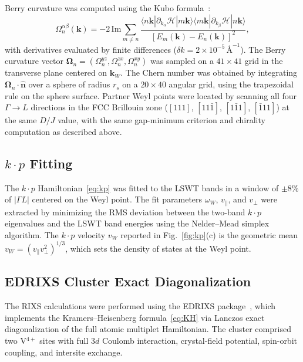\documentclass[aps,prb,twocolumn,superscriptaddress,longbibliography]{revtex4-2}
\begin{document}
Berry curvature was computed using the Kubo formula~\cite{Berry1984}:
\begin{equation}
  \Omega^{\alpha\beta}_n(\bm{k}) = -2\,\mathrm{Im}\sum_{m\neq n}
    \frac{\langle n\bm{k}|\partial_{k_\alpha}\mathcal{H}|m\bm{k}\rangle
          \langle m\bm{k}|\partial_{k_\beta}\mathcal{H}|n\bm{k}\rangle}
         {[E_m(\bm{k}) - E_n(\bm{k})]^2},
  \label{eq:kubo}
\end{equation}
with derivatives evaluated by finite differences ($\delta k = 2\times10^{-5}\,\text{\AA}^{-1}$).
The Berry curvature vector $\bm{\Omega}_n = (\Omega^{yz}_n, \Omega^{zx}_n, \Omega^{xy}_n)$
was sampled on a $41\times 41$ grid in the transverse plane centered on $\bm{k}_W$.
The Chern number was obtained by integrating $\bm{\Omega}_n\cdot\hat{\bm{n}}$ over
a sphere of radius $r_s$ on a $20\times 40$ angular grid, using the
trapezoidal rule on the sphere surface.
Partner Weyl points were located by scanning all four $\Gamma \to L$
directions in the FCC Brillouin zone ($[111]$, $[11\bar1]$, $[1\bar11]$,
$[\bar111]$) at the same $D/J$ value, with the same gap-minimum criterion
and chirality computation as described above.

\subsection{$k \cdot p$ Fitting}

The $k \cdot p$ Hamiltonian~\eqref{eq:kp} was fitted to the LSWT bands
in a window of $\pm 8\%$ of $|\Gamma L|$ centered on the Weyl point.
The fit parameters $\omega_W$, $v_\parallel$, and $v_\perp$ were extracted
by minimizing the RMS deviation between the two-band $k \cdot p$ eigenvalues
and the LSWT band energies using the Nelder--Mead simplex algorithm.
The $k \cdot p$ velocity $v_W$ reported in Fig.~\ref{fig:kp}(c) is the
geometric mean $v_W = (v_\parallel v_\perp^2)^{1/3}$, which sets the
density of states at the Weyl point.

\subsection{EDRIXS Cluster Exact Diagonalization}

The RIXS calculations were performed using the EDRIXS package~\cite{Wang2019},
which implements the Kramers--Heisenberg formula~\eqref{eq:KH} via Lanczos
exact diagonalization of the full atomic multiplet Hamiltonian.
The cluster comprised two V$^{4+}$ sites with full $3d$ Coulomb interaction,
crystal-field potential, spin-orbit coupling, and intersite exchange.
\end{document}
